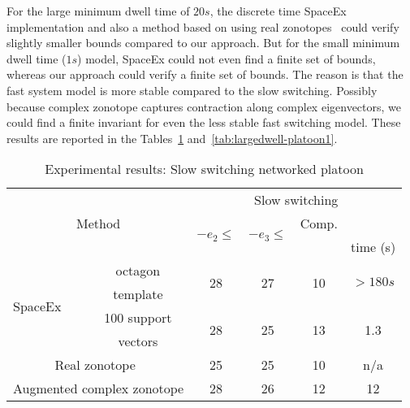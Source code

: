   For the large minimum dwell time of $20s$, the
discrete time SpaceEx implementation and also a method based on using
real zonotopes~\cite{makhlouf2014networked} could verify slightly
smaller bounds compared to our approach.  But for the small minimum
dwell time ($1s$) model, SpaceEx could not even find a finite set of
bounds, whereas our approach could verify a finite set of bounds.  The
reason is that the fast system model is more stable compared to the
slow switching.  Possibly because complex zonotope captures
contraction along complex eigenvectors, we could find a finite
invariant for even the less stable fast switching model.  These
results are reported in the Tables~\ref{tab:largedwell-platoon}
and~\ref{tab:largedwell-platoon1}.
%

\begin{table}
\begin{tabular}{|l|c|c|c|c|c|}
\hline
\multicolumn{2}{|c|}{\multirow{4}{*}{Method}} & \multicolumn{4}{|c|}{\multirow{2}{*}{Slow switching}}\\
\multicolumn{2}{|c|}{} & \multicolumn{4}{|c|}{}\\
\cline{3-6}
\multicolumn{2}{|c|}{} & \multirow{2}{*}{$-e_1\leq$} & \multirow{2}{*}{$-e_2\leq$} & \multirow{2}{*}{$-e_3\leq$} & Comp.\\
\multicolumn{2}{|c|}{} & & & & time (s)\\
\hline
\multirow{4}{*}{SpaceEx} & octagon & \multirow{2}{*}{28} &
\multirow{2}{*}{27} & \multirow{2}{*}{10}& \multirow{2}{*}{$>180s$}\\
& template & & & &\\
\cline{2-6}
& 100 support & \multirow{2}{*}{28} & \multirow{2}{*}{25} &
\multirow{2}{*}{13} & \multirow{2}{*}{1.3}\\
& vectors & & & &\\
\hline
\multicolumn{2}{|c|}{\multirow{2}{*}{Real zonotope~\cite{makhlouf2014networked}}} &
\multirow{2}{*}{25} & \multirow{2}{*}{25} & \multirow{2}{*}{10} & \multirow{2}{*}{n/a}\\
\multicolumn{2}{|c|}{} & & & &\\
\hline
\multicolumn{2}{|c|}{\multirow{2}{*}{Augmented complex zonotope}} &
\multirow{2}{*}{28} & \multirow{2}{*}{26} &
\multirow{2}{*}{12} & \multirow{2}{*}{12}\\
\multicolumn{2}{|c|}{} & & & & \\
\hline
\end{tabular}
\caption{Experimental results: Slow switching networked platoon}~\label{tab:largedwell-platoon}

\end{table}
